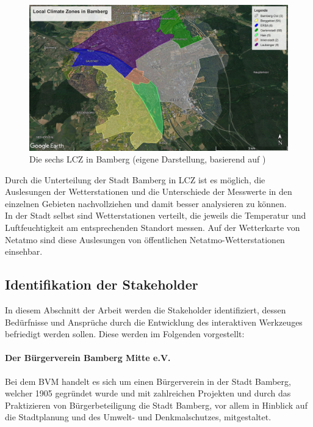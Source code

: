 \begin{figure}[t] %
    \centering
    \includegraphics[width=1\textwidth]{figures/lcz.jpg}
    \decoRule
    \caption[LCZ in Bamberg]{Die sechs \ac{LCZ} in Bamberg (eigene Darstellung, basierend auf \cite{stewart2012local,oke2004initial})} 
    \label{fig:lcz}
\end{figure}

Durch die Unterteilung der Stadt Bamberg in \ac{LCZ} ist es möglich, die Auslesungen der Wetterstationen und die Unterschiede der Messwerte in den einzelnen Gebieten nachvollziehen und damit besser analysieren zu können. \\ In der Stadt selbst sind Wetterstationen verteilt, die jeweils die Temperatur und Luftfeuchtigkeit am entsprechenden Standort messen. Auf der Wetterkarte von Netatmo sind diese Auslesungen von öffentlichen Netatmo-Wetterstationen einsehbar.

\subsection{Identifikation der Stakeholder}
\label{sec:stakeholder}
In diesem Abschnitt der Arbeit werden die Stakeholder identifiziert, dessen Bedürfnisse und Ansprüche durch die Entwicklung des interaktiven Werkzeuges befriedigt werden sollen. Diese werden im Folgenden vorgestellt:

\paragraph{Der Bürgerverein Bamberg Mitte e.V.}
Bei dem \ac{BVM} handelt es sich um einen Bürgerverein in der Stadt Bamberg, welcher 1905 gegründet wurde und mit zahlreichen Projekten und durch das Praktizieren von Bürgerbeteiligung die Stadt Bamberg, vor allem in Hinblick auf die Stadtplanung und des Umwelt- und Denkmalschutzes, mitgestaltet.

